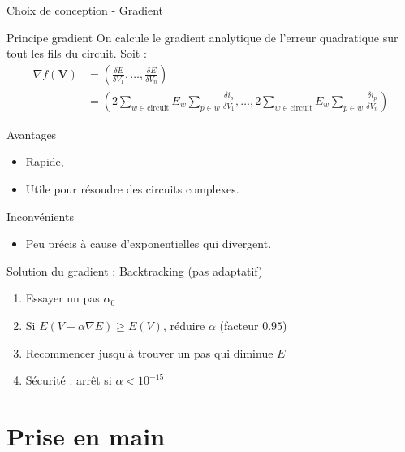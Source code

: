 \documentclass{beamer}
\begin{document}
\begin{frame}[shrink=10]{Choix de conception - Gradient}
\begin{block}{Principe gradient}
  On calcule le gradient analytique de l'erreur quadratique sur tout les fils du circuit.
  Soit :
 \[
\begin{aligned}
\nabla f(\mathbf V)
&=
\left(
\frac{\delta E}{\delta V_1},
\dots,
\frac{\delta E}{\delta V_n}
\right)
\\[0.5em]
&=
\left(
2 \sum_{w \in \mathrm{circuit}} E_w
\sum_{p \in w} \frac{\delta i_p}{\delta V_1},
\dots,
2 \sum_{w \in \mathrm{circuit}} E_w
\sum_{p \in w} \frac{\delta i_p}{\delta V_n}
\right)
\end{aligned}
\]

\end{block}
\begin{block}{Avantages}
  \begin{itemize}
    \item Rapide,
    \item Utile pour résoudre des circuits complexes.
  \end{itemize}
\end{block}
\begin{block}{Inconvénients}
  \begin{itemize}
    \item Peu précis à cause d'exponentielles qui divergent.
  \end{itemize}
\end{block}
\end{frame}

\begin{frame}{ Solution du gradient : Backtracking (pas adaptatif)}
\begin{enumerate}
\item Essayer un pas $\alpha_0$
\item Si $E(V - \alpha\nabla E) \ge E(V)$, réduire $\alpha$ (facteur $0.95$)
\item Recommencer jusqu'à trouver un pas qui diminue $E$
\item Sécurité : arrêt si $\alpha < 10^{-15}$
\end{enumerate}
\end{frame}


\section{Prise en main}
\end{document}
